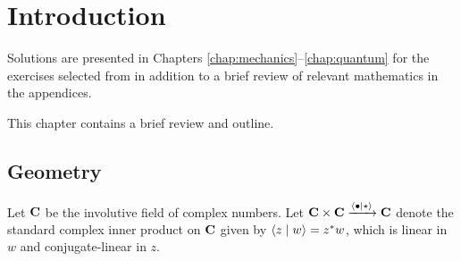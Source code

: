 

\setcounter{chapter}{-1}
\chapter{Introduction}\label{chap:intro}

Solutions are presented in Chapters \ref{chap:mechanics}--\ref{chap:quantum} for the exercises selected from \cite{TM, QM} in addition to a brief review of relevant mathematics in the appendices.

\localtableofcontents

This chapter contains a brief review and outline.

\section{Geometry}\label{sec:geometry}

Let $\mathbf{C}$ be the involutive field of complex numbers.
Let $\mathbf{C} \times \mathbf{C} \xrightarrow{\braket{\bullet \mid \star}} \mathbf{C}$ denote the standard complex inner product on $\mathbf{C}$ given by $\braket{z \mid w} = z^* w$, which is linear in $w$ and conjugate-linear in $z$.

